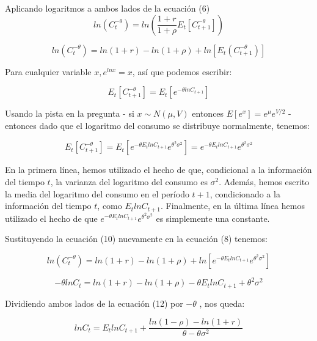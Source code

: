 \documentclass[
]{article}
\begin{document}
Aplicando logaritmos a ambos lados de la ecuación (6) \begin{equation}
ln(C_{t}^{-\theta})=ln(\frac{1+r}{1+\rho}E_t[C_{t+1}^{-\theta}])
\end{equation}

\begin{equation}
ln(C_{t}^{-\theta})=ln(1+r)-ln(1+\rho)+ln[E_t(C_{t+1}^{-\theta})]
\end{equation}

Para cualquier variable \(x , e^{lnx}=x\), así que podemos escribir:

\begin{equation}
E_t[C_{t+1}^{-\theta}]=E_t[e^{-\theta lnC_{t+1}}]
\end{equation}

Usando la pista en la pregunta - si \(x \sim N(\mu,V)\) entonces
\(E[e^x ]=e^\mu e^{V/2}\) - entonces dado que el logaritmo del consumo
se distribuye normalmente, tenemos:

\begin{equation}
E_t[C_{t+1}^{-\theta}] = E_t[e^{-\theta E_t ln C_{t+1}}e^{\theta^2\sigma^2}]=e^{-\theta E_t ln C_{t+1}}e^{\theta^2\sigma^2}
\end{equation}

En la primera línea, hemos utilizado el hecho de que, condicional a la
información del tiempo \(t\), la varianza del logaritmo del consumo es
\(\sigma^2\). Además, hemos escrito la media del logaritmo del consumo
en el período \(t +1\), condicionado a la información del tiempo \(t\),
como \(E_t lnC_{t+1}\). Finalmente, en la última línea hemos utilizado
el hecho de que \(e^{-\theta E_t ln C_{t+1}}e^{\theta^2\sigma^2}\) es
simplemente una constante.

Sustituyendo la ecuación (10) nuevamente en la ecuación (8) tenemos:

\begin{equation}
ln(C_{t}^{-\theta})=ln(1+r)-ln(1+\rho)+ln[e^{-\theta E_t ln C_{t+1}}e^{\theta^2\sigma^2}]
\end{equation}

\begin{equation}
-\theta ln C_t = ln(1+r) - ln(1+\rho) -\theta E_t ln C_{t+1} + \theta^2 \sigma^2
\end{equation}

Dividiendo ambos lados de la ecuación (12) por \(-\theta\) , nos queda:

\begin{equation}
ln C_t = E_t ln C_{t+1} + \frac { ln(1-\rho)-ln(1+r)}{\theta - \theta \sigma^2}
\end{equation}
\end{document}
